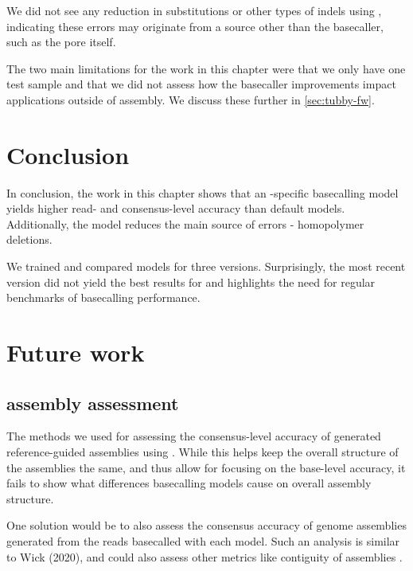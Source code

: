 We did not see any reduction in substitutions or other types of indels using \tubby{}, indicating these errors may originate from a source other than the basecaller, such as the pore itself.

\noindent
The two main limitations for the work in this chapter were that we only have one test sample and that we did not assess how the basecaller improvements impact applications outside of assembly. We discuss these further in \autoref{sec:tubby-fw}.


\section{Conclusion}
In conclusion, the work in this chapter shows that an \mtb{}-specific \ont{} basecalling model yields higher read- and consensus-level accuracy than default \guppy{} models. Additionally, the \mtb{} model reduces the main source of \ont{} errors - homopolymer deletions.

We trained and compared models for three \guppy{} versions. Surprisingly, the most recent version did not yield the best results for \mtb{} and highlights the need for regular benchmarks of \ont{} basecalling performance.

\section{Future work}
\label{sec:tubby-fw}

\subsection{\denovo{} assembly assessment}
The methods we used for assessing the consensus-level accuracy of \tubby{} generated reference-guided assemblies using . While this helps keep the overall structure of the assemblies the same, and thus allow for focusing on the base-level accuracy, it fails to show what differences basecalling models cause on overall assembly structure.

One solution would be to also assess the consensus accuracy of \denovo{} genome assemblies generated from the \ont{} reads basecalled with each model. Such an analysis is similar to Wick \etal{} (2020), and could also assess other metrics like contiguity of assemblies \cite{wick2020}.

